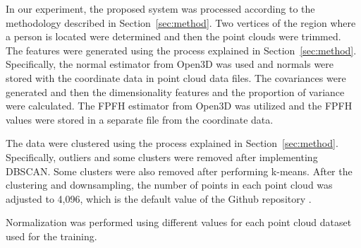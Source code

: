 \begin{deletedblock}
In our experiment, the proposed system was processed according to the methodology described in Section~\ref{sec:method}.
  Two vertices of the region where a person is located were determined and then the point clouds were trimmed. 
The features were generated using the process explained in Section~\ref{sec:method}. 
  Specifically, the normal estimator from Open3D was used and normals were stored with the coordinate data in point cloud data files. 
  The covariances were generated and then the dimensionality features and the proportion of variance were calculated. 
  The FPFH estimator from Open3D was utilized and the FPFH values were stored in a separate file from the coordinate data. 
\end{deletedblock}
  \begin{deletedblock}
  The data were clustered using the process explained in Section~\ref{sec:method}. 
    Specifically, outliers and some clusters were removed after implementing DBSCAN.
    Some clusters were also removed after performing k-means. 
  After the clustering and downsampling, the number of points in each point cloud was adjusted to 4,096, which is the default value of the Github repository \cite{pytorchpointnet++}. 
  \end{deletedblock}
  Normalization was performed using different values for each point cloud dataset used for the training. 
